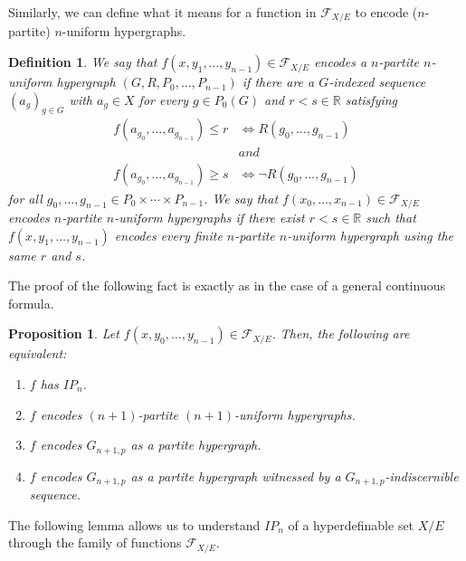 \documentclass{amsart}
\newtheorem{prop}[teor]{Proposition}
\newtheorem{defin}[teor]{Definition}
\newtheorem{external claim}[teor]{Claim}
\begin{document}

Similarly, we can define what it means for a function in $\mathcal{F}_{X/E}$ to encode ($n$-partite) $n$-uniform hypergraphs.
\begin{defin}
    We say that  $f(x,y_1,\dots,y_{n-1})\in \mathcal{F}_{X/E}$ \emph{encodes a $n$-partite $n$-uniform hypergraph} $(G,R,P_0,\dots,P_{n-1})$ if there are a $G$-indexed sequence $(a_g)_{g\in G}$ with $a_g\in X$ for every $g\in P_0(G)$ and $r<s\in\mathbb{R}$ satisfying 
    \begin{align*}
    f( a_{g_0},\dots, a_{g_{n-1}}  )\leq r &\iff  R(g_0,\dots, g_{n-1})\\
    &and\\
    f(a_{g_0},\dots, a_{g_{n-1}}  )\geq s &\iff \neg R(g_0,\dots, g_{n-1})
    \end{align*}
    for all $g_0,\dots,g_{n-1}\in P_0\times\cdots\times P_{n-1}$.
    We say that $f(x_0,\dots,x_{n-1})\in \mathcal{F}_{X/E}$ \emph{ encodes $n$-partite $n$-uniform hypergraphs} if there exist $r<s\in\mathbb{R}$ such that $f(x,y_1,\dots,y_{n-1})$ encodes every finite $n$-partite $n$-uniform hypergraph using the same $r$ and $s$.
\end{defin}

The proof of the following fact is exactly as in the case of a general continuous formula.

\begin{prop} \label{Hyperim: IP_n iff encoding partite} Let $f(x,y_0,\dots,y_{n-1})\in \mathcal{F}_{X/E}$. Then, the following are equivalent:
\begin{enumerate}
    \item $f$ has $IP_n$.
    \item $f$ encodes $(n+1)$-partite $(n+1)$-uniform hypergraphs.
    \item $f$ encodes $G_{n+1,p}$ as a partite hypergraph.
    \item $f$ encodes $G_{n+1,p}$ as a partite hypergraph witnessed by a $G_{n+1,p}$-indiscernible sequence.
\end{enumerate}
\end{prop}

The following lemma allows us to understand $IP_n$ of a hyperdefinable set $X/E$ through the family of functions $\mathcal{F}_{X/E}$.
\end{document}
